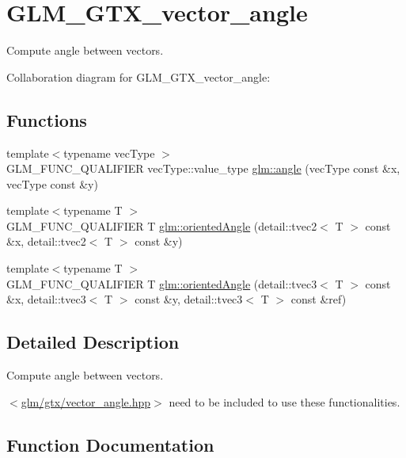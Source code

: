 \hypertarget{group__gtx__vector__angle}{}\section{G\+L\+M\+\_\+\+G\+T\+X\+\_\+vector\+\_\+angle}
\label{group__gtx__vector__angle}


Compute angle between vectors.  


Collaboration diagram for G\+L\+M\+\_\+\+G\+T\+X\+\_\+vector\+\_\+angle\+:
\subsection*{Functions}
\begin{DoxyCompactItemize}
\item 
{\footnotesize template$<$typename vec\+Type $>$ }\\G\+L\+M\+\_\+\+F\+U\+N\+C\+\_\+\+Q\+U\+A\+L\+I\+F\+I\+E\+R vec\+Type\+::value\+\_\+type \hyperlink{group__gtx__vector__angle_gaff9a524d6451772dc6df11f8880498fa}{glm\+::angle} (vec\+Type const \&x, vec\+Type const \&y)
\item 
{\footnotesize template$<$typename T $>$ }\\G\+L\+M\+\_\+\+F\+U\+N\+C\+\_\+\+Q\+U\+A\+L\+I\+F\+I\+E\+R T \hyperlink{group__gtx__vector__angle_ga4268cbf9472bcaeeab131626f8971301}{glm\+::oriented\+Angle} (detail\+::tvec2$<$ T $>$ const \&x, detail\+::tvec2$<$ T $>$ const \&y)
\item 
{\footnotesize template$<$typename T $>$ }\\G\+L\+M\+\_\+\+F\+U\+N\+C\+\_\+\+Q\+U\+A\+L\+I\+F\+I\+E\+R T \hyperlink{group__gtx__vector__angle_ga3f15db506641d5f9461259672b7f276c}{glm\+::oriented\+Angle} (detail\+::tvec3$<$ T $>$ const \&x, detail\+::tvec3$<$ T $>$ const \&y, detail\+::tvec3$<$ T $>$ const \&ref)
\end{DoxyCompactItemize}


\subsection{Detailed Description}
Compute angle between vectors. 

$<$\hyperlink{vector__angle_8hpp}{glm/gtx/vector\+\_\+angle.\+hpp}$>$ need to be included to use these functionalities. 

\subsection{Function Documentation}
\hypertarget{group__gtx__vector__angle_gaff9a524d6451772dc6df11f8880498fa}{}
